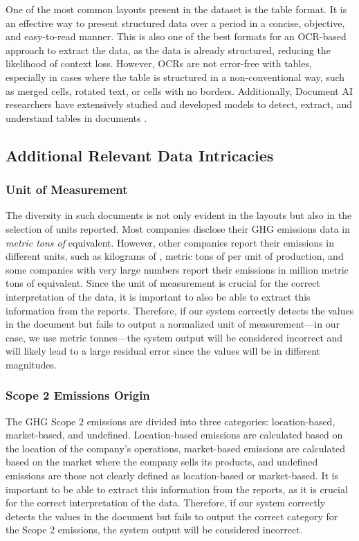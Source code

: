 \documentclass[english, 12pt, a4paper, elec, utf8, a-2b, online]{aaltothesis}
\begin{document}
One of the most common layouts present in the dataset is the table format.
It is an effective way to present structured data over a period in a concise, objective, and easy-to-read manner.
This is also one of the best formats for an \ac{OCR}-based approach to extract the data, as the data is already structured, reducing the likelihood of context loss.
However, \ac{OCR}s are not error-free with tables, especially in cases where the table is structured in a non-conventional way, such as merged cells, rotated text, or cells with no borders.
Additionally, Document \ac{AI} researchers have extensively studied and developed models to detect, extract, and understand tables in documents \cite{TableNet2020, table_extraction_conditional_pinto_2003, Schreiber2017, Li2022, Gilani2017, Shafait2010}.

\subsection{Additional Relevant Data Intricacies}

\subsubsection{Unit of Measurement}

The diversity in such documents is not only evident in the layouts but also in the selection of units reported.
Most companies disclose their \ac{GHG} emissions data in \textit{metric tons of } equivalent.
However, other companies report their emissions in different units, such as kilograms of , metric tons of  per unit of production, and some companies with very large numbers report their emissions in million metric tons of  equivalent.
Since the unit of measurement is crucial for the correct interpretation of the data, it is important to also be able to extract this information from the reports.
Therefore, if our system correctly detects the values in the document but fails to output a normalized unit of measurement—in our case, we use metric tonnes—the system output will be considered incorrect and will likely lead to a large residual error since the values will be in different magnitudes.

\subsubsection{Scope 2 Emissions Origin}

The \ac{GHG} Scope 2 emissions are divided into three categories: location-based, market-based, and undefined.
Location-based emissions are calculated based on the location of the company's operations, market-based emissions are calculated based on the market where the company sells its products, and undefined emissions are those not clearly defined as location-based or market-based.
It is important to be able to extract this information from the reports, as it is crucial for the correct interpretation of the data.
Therefore, if our system correctly detects the values in the document but fails to output the correct category for the Scope 2 emissions, the system output will be considered incorrect.
\end{document}
